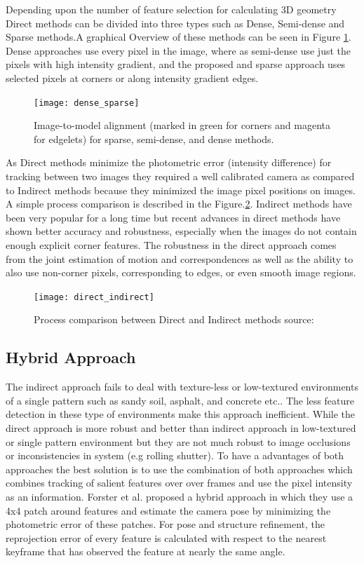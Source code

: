 Depending upon the number of feature selection for calculating 3D geometry Direct methods can be divided into three types such as Dense, Semi-dense and Sparse methods.A graphical Overview of these methods can be seen in Figure \ref{fig:dense_sparse}. Dense approaches use every pixel in the image, where as semi-dense use just the pixels with high intensity gradient, and the proposed and sparse approach uses selected pixels at corners or along intensity gradient edges.\cite{engel14eccv}

\begin{figure}[h]
	\centering
	\texttt{[image: dense\_sparse]}
	\caption{Image-to-model alignment (marked in green for corners and magenta for
		edgelets) for sparse, semi-dense, and dense methods. \cite{7782863} }
	\label{fig:dense_sparse}
\end{figure}

As Direct methods minimize the photometric error (intensity difference) for tracking between two images they required a well calibrated camera as compared to Indirect methods because they minimized the image pixel positions on images. A simple process comparison is described in the Figure.\ref{fig:direct_indirect}. Indirect methods have been very popular for a long time but recent advances in direct methods have shown better accuracy and robustness, especially when the images do not contain enough explicit corner features.\cite{Engel-et-al-pami2018} The robustness in the direct approach comes from the joint estimation of motion and correspondences as well as the ability to also use non-corner pixels, corresponding to edges, or even smooth image regions.\cite{gao2018ldso}

\begin{figure}[h]
	\centering
	\texttt{[image: direct\_indirect]}
	\caption{Process comparison between Direct and Indirect methods {source:\cite{engel14eccv}}}
	\label{fig:direct_indirect}
\end{figure}


\subsection{Hybrid Approach}
The indirect approach fails to deal with texture-less or low-textured environments of a single pattern such as sandy soil, asphalt, and concrete etc.. The less feature detection in these type of environments make this approach inefficient. While the direct approach is more robust and better than indirect approach in low-textured or single pattern environment but they are not much robust to image occlusions or inconsistencies in system (e.g rolling shutter). To have a advantages of both approaches the best solution is to use the combination of both approaches which combines tracking of salient features over over frames and use the pixel intensity as an information\cite{Aqel-et-al-2016}. Forster et al.\cite{7782863} proposed a hybrid approach in which they use a 4x4 patch around features and estimate the camera pose by minimizing the photometric error of these patches. For pose and structure refinement, the reprojection error of every feature is calculated with respect to the nearest keyframe that has observed the feature at nearly the same angle. \\

